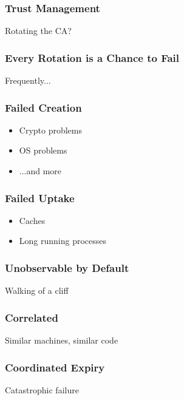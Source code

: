 \begin{frame}
\frametitle{Trust Management}

Rotating the CA?

\end{frame}

\begin{frame}
\frametitle{Every Rotation is a Chance to Fail}

Frequently...

\end{frame}


\begin{frame}
\frametitle{Failed Creation}
\begin{itemize}
\item Crypto problems
\item OS problems
\item ...and more
\end{itemize}
\end{frame}

\begin{frame}
\frametitle{Failed Uptake}
\begin{itemize}
\item Caches
\item Long running processes
\end{itemize}
\end{frame}


\begin{frame}
\frametitle{Unobservable by Default}
Walking of a cliff
\end{frame}

\begin{frame}
\frametitle{Correlated}
Similar machines, similar code
\end{frame}

\begin{frame}
\frametitle{Coordinated Expiry}

Catastrophic failure
\end{frame}


